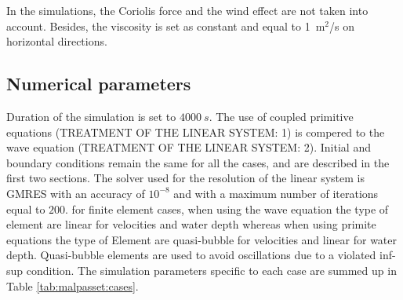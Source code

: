 In the simulations, the Coriolis force and the wind effect are not taken into account. Besides, the viscosity is set as constant and equal to 1~m$^2$/s on horizontal directions.

\subsection{Numerical parameters}
\label{subsection:malpasset:cases}
Duration of the simulation is set to $4000~s$.
The use of coupled primitive equations (TREATMENT OF THE LINEAR SYSTEM: 1) 
is compered to the wave equation (TREATMENT OF THE LINEAR SYSTEM: 2).
Initial and boundary conditions remain the same for all the cases, and are described in the first two sections.
The solver used for the resolution of the linear system is GMRES with an accuracy of $10^{-8}$ and with a maximum number
of iterations equal to $200$.
for finite element cases, when using the wave equation the type of element are linear for velocities and water depth
whereas when using primite equations the type of Element are quasi-bubble for velocities and linear for water depth.
Quasi-bubble elements are used to avoid oscillations due to a violated inf-sup condition. 
The simulation parameters specific to each case are summed up in Table \ref{tab:malpasset:cases}.
\begin{table}[H]
  \caption{List of the simulation parameters used for the different cases tested}
  \label{tab:malpasset:cases}
\end{table}

